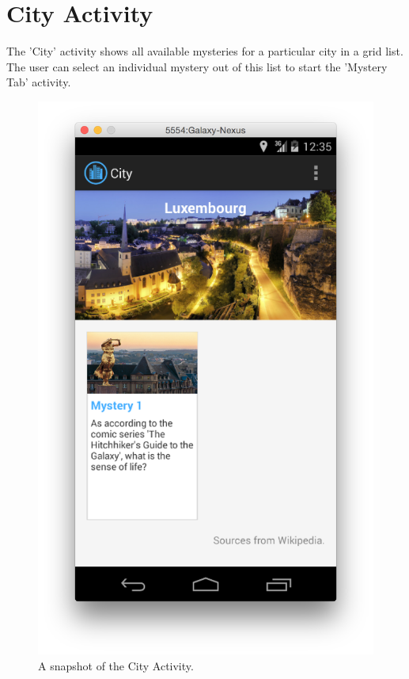 \section{City Activity}

The 'City' activity shows all available mysteries for a particular city in a grid list. The user can select an individual mystery out of this list to start the 'Mystery Tab' activity.

\begin{figure}[H]
	\centering
	\includegraphics[scale=0.4]{Figures/CityActivity}
	\caption{A snapshot of the City Activity.}
\end{figure}

